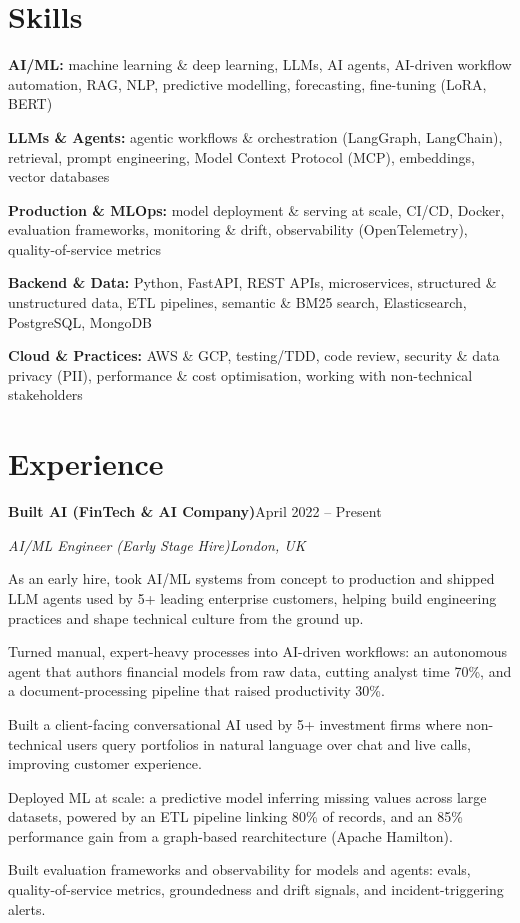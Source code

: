 \documentclass[10pt,a4paper]{article}
\newcommand{\entry}[4]{%
  {\color{company}\bfseries #1}\hfill {\color{muted}#2}\par
  \vspace{1pt}
  {\itshape #3}\hfill {\color{muted}\itshape #4}\par
  \vspace{3pt}%
}
\begin{document}
\section{Skills}
\begin{tight}
  \item[\textcolor{accent}{\small$\bullet$}] \textbf{AI/ML:} machine learning \& deep learning, LLMs, AI agents, AI-driven workflow automation, RAG, NLP, predictive modelling, forecasting, fine-tuning (LoRA, BERT)
  \item[\textcolor{accent}{\small$\bullet$}] \textbf{LLMs \& Agents:} agentic workflows \& orchestration (LangGraph, LangChain), retrieval, prompt engineering, Model Context Protocol (MCP), embeddings, vector databases
  \item[\textcolor{accent}{\small$\bullet$}] \textbf{Production \& MLOps:} model deployment \& serving at scale, CI/CD, Docker, evaluation frameworks, monitoring \& drift, observability (OpenTelemetry), quality-of-service metrics
  \item[\textcolor{accent}{\small$\bullet$}] \textbf{Backend \& Data:} Python, FastAPI, REST APIs, microservices, structured \& unstructured data, ETL pipelines, semantic \& BM25 search, Elasticsearch, PostgreSQL, MongoDB
  \item[\textcolor{accent}{\small$\bullet$}] \textbf{Cloud \& Practices:} AWS \& GCP, testing/TDD, code review, security \& data privacy (PII), performance \& cost optimisation, working with non-technical stakeholders
\end{tight}

\section{Experience}
\entry{Built AI (FinTech \& AI Company)}{April 2022 -- Present}{AI/ML Engineer (Early Stage Hire)}{London, UK}
\begin{tight}
  \item As an early hire, took AI/ML systems from concept to production and shipped LLM agents used by 5+ leading enterprise customers, helping build engineering practices and shape technical culture from the ground up.
  \item Turned manual, expert-heavy processes into AI-driven workflows: an autonomous agent that authors financial models from raw data, cutting analyst time 70\%, and a document-processing pipeline that raised productivity 30\%.
  \item Built a client-facing conversational AI used by 5+ investment firms where non-technical users query portfolios in natural language over chat and live calls, improving customer experience.
  \item Deployed ML at scale: a predictive model inferring missing values across large datasets, powered by an ETL pipeline linking 80\% of records, and an 85\% performance gain from a graph-based rearchitecture (Apache Hamilton).
  \item Built evaluation frameworks and observability for models and agents: evals, quality-of-service metrics, groundedness and drift signals, and incident-triggering alerts.
\end{tight}
\end{document}
